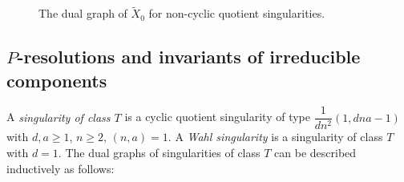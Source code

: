 \documentclass[reqno, twoside, a4paper]{amsart}
\theoremstyle{definition}
\numberwithin{equation}{section}
\begin{document}
\begin{figure}[t]
{}

\caption{The dual graph of $\widetilde{X}_0$ for non-cyclic quotient singularities.}

\label{figure:non-cyclic-widetilde(X)}
\end{figure}






\subsection{$P$-resolutions and invariants of irreducible components}
\label{subsection:P-resolution-vs-invariant}

A \emph{singularity of class $T$} is a cyclic quotient singularity of type $\dfrac{1}{dn^2}(1, dna-1)$ with $d, a \ge 1$, $n \ge 2 $, $(n,a)=1$. A \emph{Wahl singularity} is a singularity of class $T$ with $d=1$. The dual graphs of singularities of class $T$ can be described inductively as follows:
\end{document}

